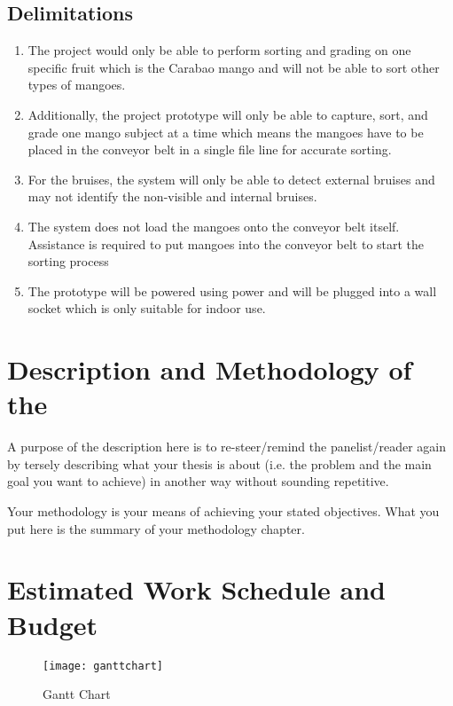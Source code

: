 \subsection{Delimitations}
\begin{enumerate}
	\item The project would only be able to perform sorting and grading on one specific fruit 
	which is the Carabao mango and will not be able to sort other types of mangoes.
	
	\item Additionally, the project prototype will only be able to capture, sort, and grade one 
	mango subject at a time which means the mangoes have to be placed in the conveyor belt in
	 a single file line for accurate sorting. 
	
	\item For the bruises, the system will only be able to detect external bruises and 
	may not identify the non-visible and internal bruises.
	\item The system does not load the mangoes onto the conveyor belt itself. 
	Assistance is required to put mangoes into the conveyor belt to start the sorting process
	\item The prototype will be powered using  power and will be plugged into 
	a wall socket which is only suitable for indoor use.
\end{enumerate}

\section{Description and Methodology of the \documentType}

A purpose of the description here is to re-steer/remind the panelist/reader again by tersely describing what your thesis is about (i.e. the problem and the main goal you want to achieve) in another way without sounding repetitive. 

Your methodology is your means of achieving your stated objectives. What you put here is the summary of your methodology chapter.



\graytx{\blindtext}


\ifFinished
\else

\section{Estimated Work Schedule and Budget}

\begin{figure}[!htbp]
	\centering
	\texttt{[image: ganttchart]}
	\caption{Gantt Chart}
	\label{fig:img2}
\end{figure}

